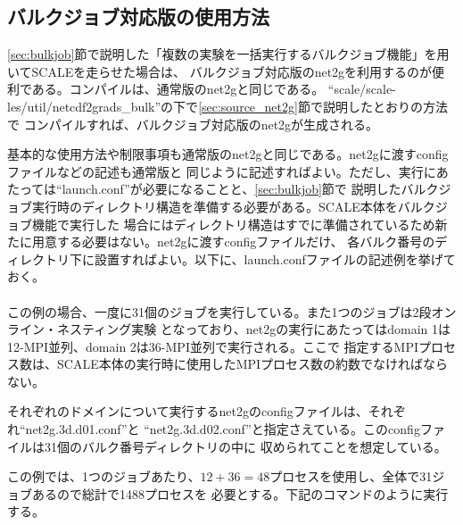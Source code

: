 \subsection{バルクジョブ対応版の使用方法}

\ref{sec:bulkjob}節で説明した「複数の実験を一括実行するバルクジョブ機能」を用いてSCALEを走らせた場合は、
バルクジョブ対応版のnet2gを利用するのが便利である。コンパイルは、通常版のnet2gと同じである。
``scale/scale-les/util/netcdf2grads\_bulk''の下で\ref{sec:source_net2g}節で説明したとおりの方法で
コンパイルすれば、バルクジョブ対応版のnet2gが生成される。

基本的な使用方法や制限事項も通常版のnet2gと同じである。net2gに渡すconfigファイルなどの記述も通常版と
同じように記述すればよい。ただし、実行にあたっては``launch.conf''が必要になることと、\ref{sec:bulkjob}節で
説明したバルクジョブ実行時のディレクトリ構造を準備する必要がある。SCALE本体をバルクジョブ機能で実行した
場合にはディレクトリ構造はすでに準備されているため新たに用意する必要はない。net2gに渡すconfigファイルだけ、
各バルク番号のディレクトリ下に設置すればよい。以下に、launch.confファイルの記述例を挙げておく。\\

\\

\noindent この例の場合、一度に31個のジョブを実行している。また1つのジョブは2段オンライン・ネスティング実験
となっており、net2gの実行にあたってはdomain 1は12-MPI並列、domain 2は36-MPI並列で実行される。ここで
指定するMPIプロセス数は、SCALE本体の実行時に使用したMPIプロセス数の約数でなければならない。

それぞれのドメインについて実行するnet2gのconfigファイルは、それぞれ``net2g.3d.d01.conf''と
``net2g.3d.d02.conf''と指定さえている。このconfigファイルは31個のバルク番号ディレクトリの中に
収められてことを想定している。

この例では、1つのジョブあたり、$12 + 36 = 48$プロセスを使用し、全体で31ジョブあるので総計で1488プロセスを
必要とする。下記のコマンドのように実行する。


